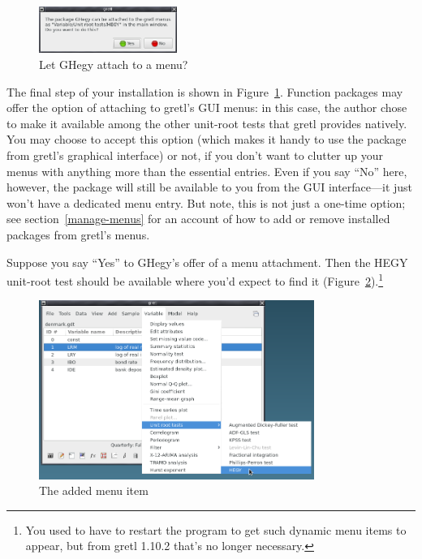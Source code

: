 \documentclass[oneside]{book}
\begin{document}
\begin{figure}[htbp]
\begin{center}
  \includegraphics[width=0.4\textwidth]{figures/ghegy-menu.png}
\end{center}
\caption{Let GHegy attach to a menu?}
\label{fig:ghegy-menu}
\end{figure}

The final step of your installation is shown in
Figure~\ref{fig:ghegy-menu}.  Function packages may offer the option
of attaching to gretl's GUI menus: in this case, the author chose to
make it available among the other unit-root tests that gretl provides
natively. You may choose to accept this option (which makes it handy
to use the package from gretl's graphical interface) or not, if you
don't want to clutter up your menus with anything more than the
essential entries. Even if you say ``No'' here, however, the package
will still be available to you from the GUI interface---it just won't
have a dedicated menu entry. But note, this is not just a one-time
option; see section~\ref{manage-menus} for an account of how to add or
remove installed packages from gretl's menus.\label{pg:menu-hook}

Suppose you say ``Yes'' to \textsf{GHegy}'s offer of a menu
attachment. Then the HEGY unit-root test should be available where
you'd expect to find it (Figure~\ref{fig:ghegy-hook}).\footnote{You
  used to have to restart the program to get such dynamic menu items
  to appear, but from gretl 1.10.2 that's no longer necessary.}

\begin{figure}[htbp]
\begin{center}
  \includegraphics[width=0.8\textwidth]{figures/ghegy-hook.png}
\end{center}
\caption{The added menu item}
\label{fig:ghegy-hook}
\end{figure}
\end{document}
